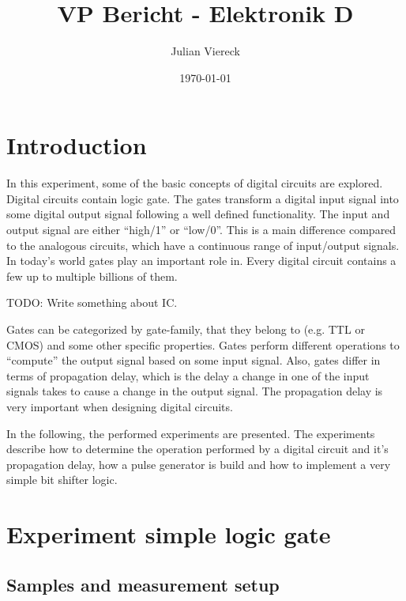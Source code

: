 \documentclass[journal]{IEEEtran}
\title{VP Bericht - Elektronik D}
\author{Julian Viereck}
\date{\today}                                           %
\begin{document}
\maketitle

\begin{abstract}
\end{abstract}

\tableofcontents

\section{Introduction}

In this experiment, some of the basic concepts of digital circuits are explored.
Digital circuits contain logic gate. The gates transform a
digital input signal into some digital output signal following a well defined functionality.
The input and output signal are either ``high/1'' or ``low/0''. This is a main
difference compared to the analogous circuits, which have a continuous range of
input/output signals. In today's world gates play an important role in. Every
digital circuit contains a few up to multiple billions of them.

TODO: Write something about IC.

Gates can be categorized by gate-family, that they belong to (e.g. TTL or CMOS)
and some other specific properties. Gates perform different operations to
``compute'' the output signal based on some input signal. Also, gates differ in
terms of propagation delay, which is the delay a change in one of the input
signals takes to cause a change in the output signal. The propagation delay is
very important when designing digital circuits.

In the following, the performed experiments are presented. The experiments
describe how to determine the operation performed by a digital circuit and it's
propagation delay, how a pulse generator is build and how to implement a very
simple bit shifter logic.

\section{Experiment simple logic gate}

\subsection{Samples and measurement setup}
\end{document}
